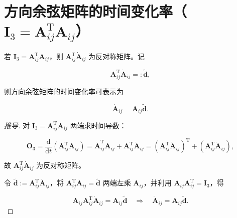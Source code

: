 \section{方向余弦矩阵的时间变化率（\texorpdfstring{$\boldsymbol{I}_3=\boldsymbol{A}_{ij}^{\mathrm{T}}\boldsymbol{A}_{ij}$}{I_3=AijTAij}）}
\begin{theorem}
若 $\boldsymbol{I}_3=\boldsymbol{A}_{ij}^{\mathrm{T}}\boldsymbol{A}_{ij}$，则 $\boldsymbol{A}_{ij}^{\mathrm{T}}\dot{\boldsymbol{A}}_{ij}$ 为反对称矩阵。记

\[
\boldsymbol{A}_{ij}^{\mathrm{T}}\dot{\boldsymbol{A}}_{ij}=:\tilde{\boldsymbol{d}},
\]

则方向余弦矩阵的时间变化率可表示为

\[
\dot{\boldsymbol{A}}_{ij}=\boldsymbol{A}_{ij}\tilde{\boldsymbol{d}}.
\]
\end{theorem}
\begin{proof}[推导]
对 $\boldsymbol{I}_3=\boldsymbol{A}_{ij}^{\mathrm{T}}\boldsymbol{A}_{ij}$ 两端求时间导数：

\[
\boldsymbol{O}_3=\frac{\mathrm{d}}{\mathrm{d}t}\left(\boldsymbol{A}_{ij}^{\mathrm{T}}\boldsymbol{A}_{ij}\right)
=\dot{\boldsymbol{A}}_{ij}^{\mathrm{T}}\boldsymbol{A}_{ij}+\boldsymbol{A}_{ij}^{\mathrm{T}}\dot{\boldsymbol{A}}_{ij}
=\left(\boldsymbol{A}_{ij}^{\mathrm{T}}\dot{\boldsymbol{A}}_{ij}\right)^{\mathrm{T}}+\left(\boldsymbol{A}_{ij}^{\mathrm{T}}\dot{\boldsymbol{A}}_{ij}\right),
\]

故 $\boldsymbol{A}_{ij}^{\mathrm{T}}\dot{\boldsymbol{A}}_{ij}$ 为反对称矩阵。

令 $\tilde{\boldsymbol{d}}:=\boldsymbol{A}_{ij}^{\mathrm{T}}\dot{\boldsymbol{A}}_{ij}$，将 $\boldsymbol{A}_{ij}^{\mathrm{T}}\dot{\boldsymbol{A}}_{ij}=\tilde{\boldsymbol{d}}$ 两端左乘 $\boldsymbol{A}_{ij}$，并利用 $\boldsymbol{A}_{ij}\boldsymbol{A}_{ij}^{\mathrm{T}}=\boldsymbol{I}_3$，得

\[
\boldsymbol{A}_{ij}\boldsymbol{A}_{ij}^{\mathrm{T}}\dot{\boldsymbol{A}}_{ij}=\boldsymbol{A}_{ij}\tilde{\boldsymbol{d}}
\quad\Longrightarrow\quad
\dot{\boldsymbol{A}}_{ij}=\boldsymbol{A}_{ij}\tilde{\boldsymbol{d}}.
\]
\end{proof}

